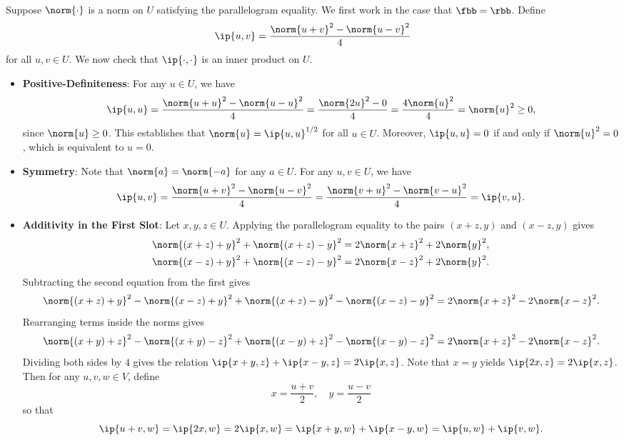 \begin{sol}
    Suppose $\norm{\cdot}$ is a norm on $U$ satisfying the parallelogram equality.
    We first work in the case that $\fbb = \rbb$.
    Define
    \[
        \ip{u, v} = \frac{\norm{u + v}^2 - \norm{u - v}^2}{4}
    \]
    for all $u, v \in U$.
    We now check that $\ip{\cdot, \cdot}$ is an inner product on $U$.
    \begin{itemize}
        \item \textbf{Positive-Definiteness}: For any $u \in U$, we have
        \[
            \ip{u, u} = \frac{\norm{u + u}^2 - \norm{u - u}^2}{4} = \frac{\norm{2u}^2 - 0}{4} = \frac{4\norm{u}^2}{4} = \norm{u}^2 \geq 0,
        \]
        since $\norm{u} \geq 0$.
        This establishes that $\norm{u} = \ip{u, u}^{1/2}$ for all $u \in U$.
        Moreover, $\ip{u, u} = 0$ if and only if $\norm{u}^2 = 0$, which is equivalent to $u = 0$.
        \item \textbf{Symmetry}: Note that $\norm{a} = \norm{-a}$ for any $a \in U$.
        For any $u, v \in U$, we have
        \[
            \ip{u, v} = \frac{\norm{u + v}^2 - \norm{u - v}^2}{4} = \frac{\norm{v + u}^2 - \norm{v - u}^2}{4} = \ip{v, u}.
        \]
        \item \textbf{Additivity in the First Slot}: Let $x, y, z \in U$.
        Applying the parallelogram equality to the pairs $(x + z, y)$ and $(x - z, y)$ gives
        \begin{align*}
            \norm{(x + z) + y}^2 + \norm{(x + z) - y}^2 &= 2\norm{x + z}^2 + 2\norm{y}^2, \\
            \norm{(x - z) + y}^2 + \norm{(x - z) - y}^2 &= 2\norm{x - z}^2 + 2\norm{y}^2.
        \end{align*}
        Subtracting the second equation from the first gives
        \[
            \norm{(x + z) + y}^2 - \norm{(x - z) + y}^2 + \norm{(x + z) - y}^2 - \norm{(x - z) - y}^2 = 2\norm{x + z}^2 - 2\norm{x - z}^2.
        \]
        Rearranging terms inside the norms gives
        \[
            \norm{(x + y) + z}^2 - \norm{(x + y) - z}^2 + \norm{(x - y) + z}^2 - \norm{(x - y) - z}^2 = 2\norm{x + z}^2 - 2\norm{x - z}^2.
        \]
        Dividing both sides by $4$ gives the relation $\ip{x + y, z} + \ip{x - y, z} = 2\ip{x, z}$.
        Note that $x = y$ yields $\ip{2x, z} = 2\ip{x, z}$.
        Then for any $u, v, w \in V$, define
        \[
            x = \frac{u + v}{2}, \quad y = \frac{u - v}{2}
        \]
        so that
        \[
            \ip{u + v, w} = \ip{2x, w} = 2\ip{x, w} = \ip{x + y, w} + \ip{x - y, w} = \ip{u, w} + \ip{v, w}.
\]
\end{itemize}
\end{sol}
